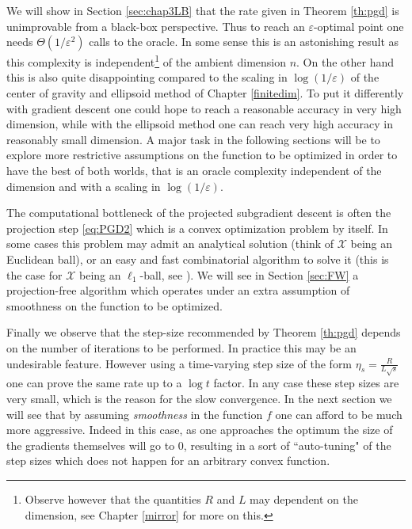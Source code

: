 \documentclass[openany]{now}
\newcommand{\cX}{\mathcal{X}}
\renewcommand{\epsilon}{\varepsilon}
\begin{document}
We will show in Section \ref{sec:chap3LB} that the rate given in Theorem \ref{th:pgd} is unimprovable from a black-box perspective. Thus to reach an $\epsilon$-optimal point one needs $\Theta(1/\epsilon^2)$ calls to the oracle. In some sense this is an astonishing result as this complexity is independent\footnote{Observe however that the quantities $R$ and $L$ may dependent on the dimension, see Chapter \ref{mirror} for more on this.} of the ambient dimension $n$. On the other hand this is also quite disappointing compared to the scaling in $\log(1/\epsilon)$ of the center of gravity and ellipsoid method of Chapter \ref{finitedim}. To put it differently with gradient descent one could hope to reach a reasonable accuracy in very high dimension, while with the ellipsoid method one can reach very high accuracy in reasonably small dimension. A major task in the following sections will be to explore more restrictive assumptions on the function to be optimized in order to have the best of both worlds, that is an oracle complexity independent of the dimension and with a scaling in $\log(1/\epsilon)$.

The computational bottleneck of the projected subgradient descent is often the projection step \eqref{eq:PGD2} which is a convex optimization problem by itself. In some cases this problem may admit an analytical solution (think of $\cX$ being an Euclidean ball), or an easy and fast combinatorial algorithm to solve it (this is the case for $\cX$ being an $\ell_1$-ball, see \cite{MP89}). We will see in Section \ref{sec:FW} a projection-free algorithm which operates under an extra assumption of smoothness on the function to be optimized.

Finally we observe that the step-size recommended by Theorem \ref{th:pgd} depends on the number of iterations to be performed. In practice this may be an undesirable feature. However using a time-varying step size of the form $\eta_s = \frac{R}{L \sqrt{s}}$ one can prove the same rate up to a $\log t$ factor. In any case these step sizes are very small, which is the reason for the slow convergence. In the next section we will see that by assuming {\em smoothness} in the function $f$ one can afford to be much more aggressive. Indeed in this case, as one approaches the optimum the size of the gradients themselves will go to $0$, resulting in a sort of ``auto-tuning" of the step sizes which does not happen for an arbitrary convex function.
\end{document}
